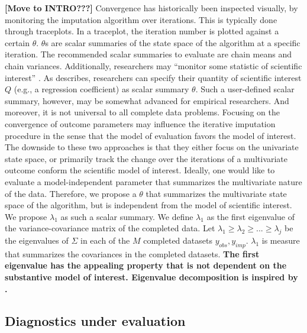 \documentclass[Royal,times,sageh]{sagej}
\begin{document}
\textbf{{[}Move to INTRO???{]}} Convergence has historically been inspected visually, by monitoring the imputation algorithm over iterations. This is typically done through traceplots. In a traceplot, the iteration number is plotted against a certain \(\theta\). \(\theta\)s are scalar summaries of the state space of the algorithm at a specific iteration. The recommended scalar summaries to evaluate are chain means and chain variances. Additionally, researchers may ``monitor some statistic of scientific interest'' \citep[\(\S\) 6.5.2]{buur18}. As \citet{buur18} describes, researchers can specify their quantity of scientific interest \(Q\) (e.g., a regression coefficient) as scalar summary \(\theta\). Such a user-defined scalar summary, however, may be somewhat advanced for empirical researchers. And moreover, it is not universal to all complete data problems. Focusing on the convergence of outcome parameters may influence the iterative imputation procedure in the sense that the model of evaluation favors the model of interest. The downside to these two approaches is that they either focus on the univariate state space, or primarily track the change over the iterations of a multivariate outcome conform the scientific model of interest. Ideally, one would like to evaluate a model-independent parameter that summarizes the multivariate nature of the data. Therefore, we propose a \(\theta\) that summarizes the multivariate state space of the algorithm, but is independent from the model of scientific interest. We propose \(\lambda_1\) as such a scalar summary. We define \(\lambda_1\) as the first eigenvalue of the variance-covariance matrix of the completed data. Let \(\lambda_1 \geq \lambda_2 \geq ... \geq \lambda_j\) be the eigenvalues of \(\Sigma\) in each of the \(M\) completed datasets \({y_{obs}, y_{imp}}\). \(\lambda_1\) is measure that summarizes the covariances in the completed datasets. \textbf{The first eigenvalue has the appealing property that is not dependent on the substantive model of interest. Eigenvalue decomposition is inspired by \citet{mack03}.}

\hypertarget{diagnostics-under-evaluation}{%
\subsection{Diagnostics under evaluation}\label{diagnostics-under-evaluation}}
\end{document}
